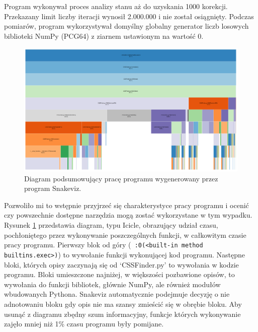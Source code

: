 \documentclass[11pt, a4paper]{article}
\newcommand{\code}[1]{\texttt{#1}}
\begin{document}
\begin{sloppypar}
    Program wykonywał proces analizy stanu aż do uzyskania 1000 korekcji. Przekazany limit
    liczby iteracji wynosił 2.000.000 i nie został osiągnięty. Podczas pomiarów, program
    wykorzystywał domyślny globalny generator liczb losowych biblioteki NumPy (PCG64\cite{NumpyDefaultGenerator})
    z ziarnem ustawionym na wartość 0.

    \FloatBarrier
    \begin{figure}[ht]
      \centering
      \includegraphics[width=1.0\textwidth]{"resources/profiling_1/graph.png"}
      \caption{Diagram podsumowujący pracę programu wygenerowany przez program Snakeviz.}
      \label{pre-prof-perf}
    \end{figure}

    Pozwoliło mi to wstępnie przyjrzeć się charakterystyce pracy programu i ocenić czy powszechnie
    dostępne narzędzia mogą zostać wykorzystane w tym wypadku. Rysunek
    \ref{pre-prof-perf} przedstawia diagram, typu Icicle, obrazujący udział czasu, pochłoniętego
    przez wykonywanie poszczególnych funkcji, w całkowitym czasie pracy programu. Pierwszy
    blok od góry (\code{~:0(<built-in method builtins.exec>)}) to wywołanie funkcji
    wykonującej kod programu. Następne bloki, których opisy zaczynają się od `CSSFinder.py'
    to wywołania w kodzie programu. Bloki umieszczone najniżej, w większości pozbawione
    opisów, to wywołania do funkcji bibliotek, głównie NumPy, ale również modułów wbudowanych
    Pythona. Snakeviz automatycznie podejmuje decyzję o nie adnotowaniu bloku gdy opis
    nie ma szansy zmieścić się w obrębie bloku. Aby usunąć z diagramu zbędny szum informacyjny,
    funkcje których wykonywanie zajęło mniej niż 1\% czasu programu były pomijane.


\end{sloppypar}
\end{document}
